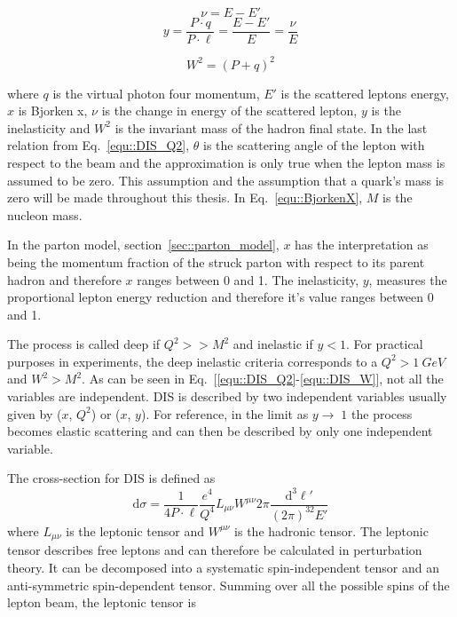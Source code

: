\begin{multicols}{2}
  \noindent
  \begin{equation}
    \nu = E - E'
  \end{equation} 
  \begin{equation}
    \label{equ::inelasticity}
    y = \frac{P \cdot q}{P \cdot \ell} = \frac{E - E'}{E} = \frac{\nu}{E}
  \end{equation} 
\end{multicols}

\begin{multicols}{2}
  \noindent
  \begin{equation}
    \label{equ::DIS_W}
    W^2 = (P+q)^2
  \end{equation}
\end{multicols}

\noindent
where $q$ is the virtual photon four momentum, $E'$ is the scattered leptons
energy, $x$ is Bjorken x, $\nu$ is the change in energy of the scattered lepton,
$y$ is the inelasticity and $W^2$ is the invariant mass of the hadron final
state.  In the last relation from Eq.~\ref{equ::DIS_Q2}, $\theta$ is the
scattering angle of the lepton with respect to the beam and the approximation is
only true when the lepton mass is assumed to be zero.  This assumption and the
assumption that a quark's mass is zero will be made throughout this thesis.  In
Eq.~\ref{equ::BjorkenX}, $M$ is the nucleon mass.

In the parton model, section~\ref{sec::parton_model}, $x$ has the interpretation
as being the momentum fraction of the struck parton with respect to its parent
hadron and therefore $x$ ranges between 0 and 1.  The inelasticity, $y$,
measures the proportional lepton energy reduction and therefore it's value
ranges between 0 and 1.

The process is called deep if $Q^2 >> M^2$ and inelastic if $y < 1$.  For
practical purposes in experiments, the deep inelastic criteria corresponds to a
$Q^2 > 1~GeV$ and $W^2 > M^2$.  As can be seen in
Eq.~[\ref{equ::DIS_Q2}-\ref{equ::DIS_W}], not all the variables are independent.
DIS is described by two independent variables usually given by ($x$, $Q^2$) or
($x$, $y$).  For reference, in the limit as $y \to \; 1$ the process becomes
elastic scattering and can then be described by only one independent variable.

The cross-section for DIS is defined as~\cite{Barone:2001sp}
\begin{equation}
  \label{equ::DIS_xsection}
  \mathrm{d}\sigma =
  \frac{1}{4P\cdot \ell}\frac{e^4}{Q^4} L_{\mu\nu}W^{\mu\nu}
  2\pi\frac{\mathrm{d}^3\ell'}{(2\pi)^32E'}
\end{equation}
\noindent
where $L_{\mu\nu}$ is the leptonic tensor and $W^{\mu\nu}$ is the hadronic
tensor.  The leptonic tensor describes free leptons and can therefore be
calculated in perturbation theory.  It can be decomposed into a systematic
spin-independent tensor and an anti-symmetric spin-dependent tensor.  Summing
over all the possible spins of the lepton beam, the leptonic tensor is

